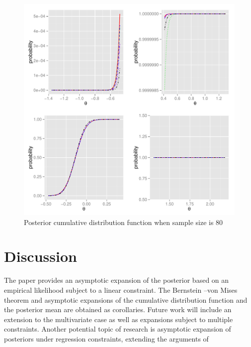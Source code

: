 \begin{figure}[H]

\begin{center}
\includegraphics[scale=0.5]{n80bw.pdf}\protect\caption{Posterior cumulative distribution function when sample size is 80\label{fig:Posterior-CDF-n80}}
\end{center}

\end{figure}
 
\section{Discussion}
The paper provides an asymptotic expansion of the posterior based on an empirical likelihood subject to a linear constraint. The Bernstein --von Mises theorem and asymptotic expansions of the cumulative distribution function and the posterior mean are obtained as corollaries. Future work will include an extension to the multivariate case as well as expansions subject to multiple constraints. Another potential topic of research is asymptotic expansion of posteriors under regression constraints, extending the arguments of \cite{ghosal1999asymptotic,ghosal2000asymptotic}

